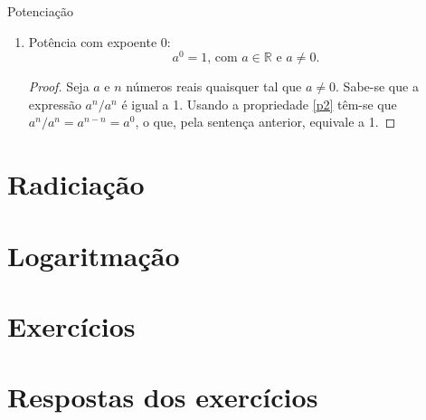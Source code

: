 \documentclass[14pt, aspectratio=169]{beamer}
\newcommand{\R}{\mathbb{R}}
\newcommand{\skipframe}{\vspace{10.0cm}}
\begin{document}
\begin{frame}[allowframebreaks]{Potenciação}
\begin{itemize}
\begin{enumerate}[a]
        \skipframe

        \item Potência com expoente 0:
        \begin{equation*}
            a^0 = 1 \text{, com } a \in \R \text{ e } a \neq 0.
        \end{equation*}

        \begin{proof}
            Seja $a$ e $n$ números reais quaisquer tal que $a \neq 0$. Sabe-se que a expressão $a^n / a^n$ é igual a 1. Usando a propriedade \ref{p2} têm-se que $a^n / a^n = a^{n-n} = a^0$, o que, pela sentença anterior, equivale a 1.
        \end{proof}
        
    \end{enumerate}

    
    
    
\end{itemize}
    
\end{frame}

\section{Radiciação}

\section{Logaritmação}

\section{Exercícios}

\section{Respostas dos exercícios}
\end{document}
